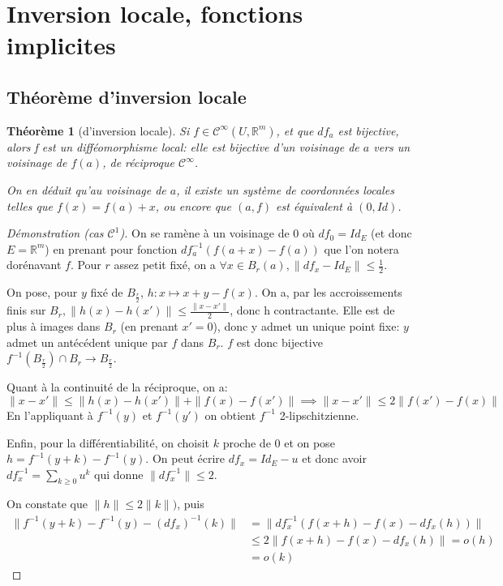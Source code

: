 \documentclass[a4paper]{article}
\newcommand{\cun}{\mathcal{C}^1}
\newcommand{\cinf}{\mathcal{C}^\infty}
\newcommand{\R}{\mathbb{R}}
\newtheorem{thm}{Théorème}
\theoremstyle{definition}
\begin{document}
\section{Inversion locale, fonctions implicites}

\subsection{Théorème d'inversion locale}

\setcounter{thm}{3}
\begin{thm}[d'inversion locale]
	Si $f\in\cinf(U,\R^m)$, et que $df_a$ est bijective, alors f est un difféomorphisme local: elle est bijective d'un voisinage de $a$ vers un voisinage de $f(a)$, de réciproque $\cinf$.

	On en déduit qu'au voisinage de $a$, il existe un système de coordonnées locales telles que $f(x)=f(a)+x$, ou encore que $(a,f)$ est équivalent à $(0,Id)$.
\end{thm}
\begin{proof}[Démonstration (cas $\cun$)]
	On se ramène à un voisinage de 0 où $df_0=Id_E$ (et donc $E=\R^m$) en prenant pour fonction $df_a^{-1}(f(a+x)-f(a))$ que l'on notera dorénavant $f$.
	Pour $r$ assez petit fixé, on a $\forall x\in B_r(a), \| df_x-Id_E \| \leq \frac{1}{2}$.

	On pose, pour $y$ fixé de $B_{\frac{r}{2}}$, $h:x\mapsto x+y-f(x)$.
	On a, par les accroissements finis sur $B_r, \| h(x) - h(x')\|\leq\frac{\| x-x' \|}{2}$, donc h contractante.
	Elle est de plus à images dans $B_r$ (en prenant $x'=0$), donc y admet un unique point fixe: $y$ admet un antécédent unique par $f$ dans $B_r$.
	$f$ est donc bijective $f^{-1}(B_\frac{r}{2}) \cap B_r \to B_{\frac{r}{2}}$.

	Quant à la continuité de la réciproque, on a:
	$$\|x-x'\| \leq \|h(x)-h(x')\| + \|f(x)-f(x')\| \implies \|x-x'\| \leq 2\|f(x')-f(x)\|$$
	En l'appliquant à $f^{-1}(y)$ et $f^{-1}(y')$ on obtient $f^{-1}$ 2-lipschitzienne.

	Enfin, pour la différentiabilité, on choisit $k$ proche de 0 et on pose $h=f^{-1}(y+k)-f^{-1}(y)$.
	On peut écrire $df_x=Id_E-u$ et donc avoir $df_x^{-1}=\sum_{k\geq0} u^k$ qui donne $\|df_x^{-1}\| \leq 2$.

	On constate que $\|h\|\leq 2\|k\|)$, puis
	\begin{align*}\| f^{-1}(y+k)-f^{-1}(y)-(df_x)^{-1}(k) \| & = \|df_x^{-1}(f(x+h)-f(x)-df_x(h))\| \\ & \leq 2\| f(x+h)-f(x)-df_x(h) \| =o(h) \\ & = o(k)\end{align*}
\end{proof}
\end{document}
